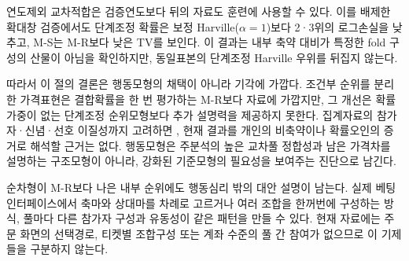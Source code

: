 연도제외 교차적합은 검증연도보다 뒤의 자료도 훈련에 사용할 수 있다. 이를
배제한 확대창 검증에서도 단계조정 확률은 보정 Harville($\alpha=1$)보다 2·3위의 로그손실을
낮추고, M-S는 M-R보다 낮은 TV를 보인다. 이 결과는 내부 축약 대비가 특정한
fold 구성의 산물이 아님을 확인하지만, 동일표본의 단계조정 Harville 우위를
뒤집지 않는다.

따라서 이 절의 결론은 행동모형의 채택이 아니라 기각에 가깝다. 조건부 순위를
분리한 가격표현은 결합확률을 한 번 평가하는 M-R보다 자료에 가깝지만, 그
개선은 확률가중이 없는 단계조정 순위모형보다 추가 설명력을 제공하지 못한다.
집계자료의 참가자·신념·선호 이질성까지 고려하면 \citep{chiapporietal2019,
gandhiserranopadial2015}, 현재 결과를 개인의 비축약이나 확률오인의 증거로
해석할 근거는 없다. 행동모형은 주분석의 높은 교차풀 정합성과 남은 가격차를
설명하는 구조모형이 아니라, 강화된 기준모형의 필요성을 보여주는 진단으로
남긴다.

순차형이 M-R보다 나은 내부 순위에도 행동심리 밖의 대안 설명이 남는다. 실제
베팅 인터페이스에서 축마와 상대마를 차례로 고르거나 여러 조합을 한꺼번에
구성하는 방식, 풀마다 다른 참가자 구성과 유동성이 같은 패턴을 만들 수 있다.
현재 자료에는 주문 화면의 선택경로, 티켓별 조합구성 또는 계좌 수준의 풀 간
참여가 없으므로 이 기제들을 구분하지 않는다.
